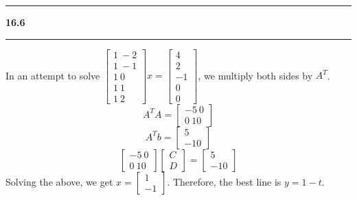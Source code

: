 \documentclass[11pt]{article}
\newcommand\question[2]{\vspace{.25in}\hrule\textbf{#1 #2}\vspace{.5em}\hrule\vspace{.10in}}
\begin{document}
\question{16.6}{}
In an attempt to solve \(\begin{bmatrix} 1 \ -2 \\ 1 \ -1 \\ 1 \ 0 \\ 1 \ 1 \\ 1 \ 2 \end{bmatrix}x = \begin{bmatrix} 4 \\ 2 \\ -1 \\ 0 \\ 0 \end{bmatrix}\), we multiply both sides by \(A^T\).
$$A^TA = \begin{bmatrix} -5 \ 0 \\ 0 \ 10 \end{bmatrix}$$
$$A^Tb = \begin{bmatrix} 5 \\ -10 \end{bmatrix}$$
$$\begin{bmatrix} -5 \ 0 \\ 0 \ 10 \end{bmatrix}\begin{bmatrix} C \\ D \end{bmatrix} = \begin{bmatrix} 5 \\ -10 \end{bmatrix}$$
Solving the above, we get \(\hat{x} = \begin{bmatrix} 1 \\ -1 \end{bmatrix}\). Therefore, the best line is \(y = 1 - t\).
\end{document}
